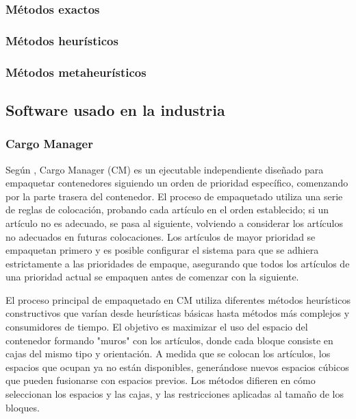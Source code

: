 
\subsubsection{Métodos exactos}

\subsubsection{Métodos heurísticos}


\subsubsection{Métodos metaheurísticos}

\subsection{Software usado en la industria}

\subsubsection{Cargo Manager}

Según \textcite{zhao2017three}, Cargo Manager (CM) es un ejecutable independiente diseñado para empaquetar contenedores siguiendo un orden de prioridad específico, comenzando por la parte trasera del contenedor. El proceso de empaquetado utiliza una serie de reglas de colocación, probando cada artículo en el orden establecido; si un artículo no es adecuado, se pasa al siguiente, volviendo a considerar los artículos no adecuados en futuras colocaciones. Los artículos de mayor prioridad se empaquetan primero y es posible configurar el sistema para que se adhiera estrictamente a las prioridades de empaque, asegurando que todos los artículos de una prioridad actual se empaquen antes de comenzar con la siguiente.

El proceso principal de empaquetado en CM utiliza diferentes métodos heurísticos constructivos que varían desde heurísticas básicas hasta métodos más complejos y consumidores de tiempo. El objetivo es maximizar el uso del espacio del contenedor formando "muros" con los artículos, donde cada bloque consiste en cajas del mismo tipo y orientación. A medida que se colocan los artículos, los espacios que ocupan ya no están disponibles, generándose nuevos espacios cúbicos que pueden fusionarse con espacios previos. Los métodos difieren en cómo seleccionan los espacios y las cajas, y las restricciones aplicadas al tamaño de los bloques.

